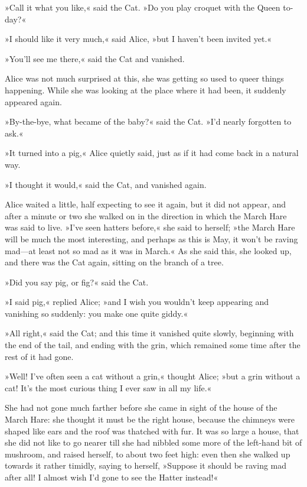 »Call it what you like,« said the Cat. »Do you play croquet with the Queen to-day?«

»I should like it very much,« said Alice, »but I haven't been invited yet.«

»You'll see me there,« said the Cat and vanished.

Alice was not much surprised at this, she was getting so used to queer things happening. While she was looking at the place where it had been, it suddenly appeared again.

»By-the-bye, what became of the baby?« said the Cat. »I'd nearly forgotten to ask.«

»It turned into a pig,« Alice quietly said, just as if it had come back in a natural way.

»I thought it would,« said the Cat, and vanished again.

Alice waited a little, half expecting to see it again, but it did not appear, and after a minute or two she walked on in the direction in which the March Hare was said to live. »I've seen hatters before,« she said to herself; »the March Hare will be much the most interesting, and perhaps as this is May, it won't be raving mad—at least not so mad as it was in March.« As she said this, she looked up, and there was the Cat again, sitting on the branch of a tree.

»Did you say pig, or fig?« said the Cat.

»I said pig,« replied Alice; »and I wish you wouldn't keep appearing and vanishing so suddenly: you make one quite giddy.«

»All right,« said the Cat; and this time it vanished quite slowly, beginning with the end of the tail, and ending with the grin, which remained some time after the rest of it had gone.

»Well! I've often seen a cat without a grin,« thought Alice; »but a grin without a cat! It's the most curious thing I ever saw in all my life.«


She had not gone much farther before she came in sight of the house of the March Hare: she thought it must be the right house, because the chimneys were shaped like ears and the roof was thatched with fur. It was so large a house, that she did not like to go nearer till she had nibbled some more of the left-hand bit of mushroom, and raised herself, to about two feet high: even then she walked up towards it rather timidly, saying to herself, »Suppose it should be raving mad after all! I almost wish I'd gone to see the Hatter instead!«

